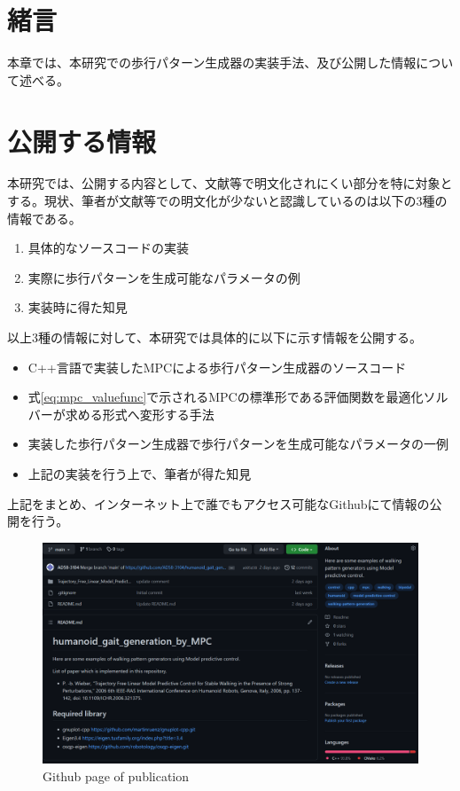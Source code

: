 \section{緒言}
本章では、本研究での歩行パターン生成器の実装手法、及び公開した情報について述べる。

\section{公開する情報}
本研究では、公開する内容として、文献等で明文化されにくい部分を特に対象とする。現状、筆者が文献等での明文化が少ないと認識しているのは以下の3種の情報である。
\begin{enumerate}
  \item 具体的なソースコードの実装
  \item 実際に歩行パターンを生成可能なパラメータの例
  \item 実装時に得た知見
\end{enumerate}

以上3種の情報に対して、本研究では具体的に以下に示す情報を公開する。

\begin{itemize}
  \item C++言語で実装したMPCによる歩行パターン生成器のソースコード
  \item 式\eqref{eq:mpc_valuefunc}で示されるMPCの標準形である評価関数を最適化ソルバーが求める形式へ変形する手法
  \item 実装した歩行パターン生成器で歩行パターンを生成可能なパラメータの一例
  \item 上記の実装を行う上で、筆者が得た知見
\end{itemize}

上記をまとめ、インターネット上で誰でもアクセス可能なGithub\cite{MYGITHUB}にて情報の公開を行う。

\begin{figure}[hbtp]
  \centering
  \includegraphics[keepaspectratio, scale=0.4]
  {images/github_example.png}
  \caption{ Github page of publication}
  \label{Fig:github_example}
\end{figure}

